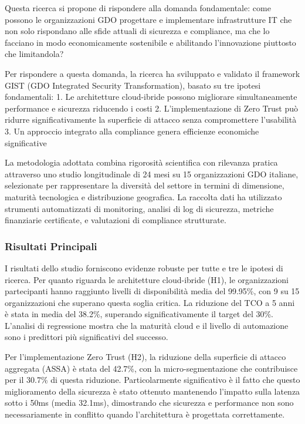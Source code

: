 \documentclass[12pt,a4paper,oneside]{book}
\begin{document}
Questa ricerca si propone di rispondere alla domanda fondamentale: come
possono le organizzazioni GDO progettare e implementare infrastrutture
IT che non solo rispondano alle sfide attuali di sicurezza e compliance,
ma che lo facciano in modo economicamente sostenibile e abilitando
l'innovazione piuttosto che limitandola?

Per rispondere a questa domanda, la ricerca ha sviluppato e validato il
framework GIST (GDO Integrated Security Transformation), basato su tre
ipotesi fondamentali: 1. Le architetture cloud-ibride possono migliorare
simultaneamente performance e sicurezza riducendo i costi 2.
L'implementazione di Zero Trust può ridurre significativamente la
superficie di attacco senza compromettere l'usabilità 3. Un approccio
integrato alla compliance genera efficienze economiche significative

La metodologia adottata combina rigorosità scientifica con rilevanza
pratica attraverso uno studio longitudinale di 24 mesi su 15
organizzazioni GDO italiane, selezionate per rappresentare la diversità
del settore in termini di dimensione, maturità tecnologica e
distribuzione geografica. La raccolta dati ha utilizzato strumenti
automatizzati di monitoring, analisi di log di sicurezza, metriche
finanziarie certificate, e valutazioni di compliance strutturate.

\subsubsection{Risultati Principali}\label{risultati-principali}

I risultati dello studio forniscono evidenze robuste per tutte e tre le
ipotesi di ricerca. Per quanto riguarda le architetture cloud-ibride
(H1), le organizzazioni partecipanti hanno raggiunto livelli di
disponibilità media del 99.95\%, con 9 su 15 organizzazioni che superano
questa soglia critica. La riduzione del TCO a 5 anni è stata in media
del 38.2\%, superando significativamente il target del 30\%. L'analisi
di regressione mostra che la maturità cloud e il livello di automazione
sono i predittori più significativi del successo.

Per l'implementazione Zero Trust (H2), la riduzione della superficie di
attacco aggregata (ASSA) è stata del 42.7\%, con la micro-segmentazione
che contribuisce per il 30.7\% di questa riduzione. Particolarmente
significativo è il fatto che questo miglioramento della sicurezza è
stato ottenuto mantenendo l'impatto sulla latenza sotto i 50ms (media
32.1ms), dimostrando che sicurezza e performance non sono
necessariamente in conflitto quando l'architettura è progettata
correttamente.
\end{document}
